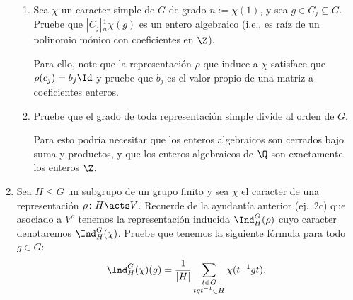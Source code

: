 \documentclass[11pt, reqno]{amsart}
\begin{document}
\begin{enumerate}
\begin{enumerate}
			\item\lookst
				Sea $\chi$ un caracter simple de $G$ de grado $n := \chi(1)$, y sea $g \in C_j \subseteq G$.
				Pruebe que $|C_j| \frac{1}{n} \chi(g)$ es un entero algebraico (i.e., es raíz de un polinomio mónico con coeficientes en $\Z$).
				\begin{hint}
					Para ello, note que la representación $\rho$ que induce a $\chi$ satisface que $\rho(c_j) = b_j\Id$
					y pruebe que $b_j$ es el valor propio de una matriz a coeficientes enteros.
				\end{hint}

			\item
				Pruebe que el grado de toda representación simple divide al orden de $G$.
				\begin{hint}
					Para esto podría necesitar que los enteros algebraicos son cerrados bajo suma y productos, y que los
					enteros algebraicos de $\Q$ son exactamente los enteros $\Z$.
				\end{hint}
		\end{enumerate}
		\nocite{huppert:finite_i}

		\newex
	\item Sea $H \le G$ un subgrupo de un grupo finito y sea $\chi$ el caracter de una representación $\rho \colon H \acts V$.
		Recuerde de la ayudantía anterior (ej.~2c) que asociado a $V^\rho$ tenemos la representación inducida $\Ind^G_H(\rho)$ cuyo
		caracter denotaremos $\Ind^G_H(\chi)$.
		Pruebe que tenemos la siguiente fórmula para todo $g \in G$:
		\[
			\Ind_H^G(\chi)(g) = \frac{1}{|H|} \sum_{\substack{t\in G \\ tgt^{-1} \in H}} \chi(t^{-1}gt).
		\]
		\nocite{serre:representations}
\end{enumerate}
\end{document}
